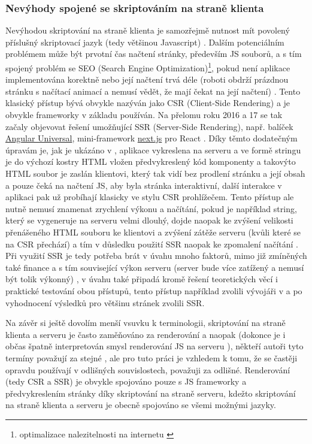         \subsubsection{Nevýhody spojené se skriptováním na straně klienta}
        Nevýhodou skriptování na straně klienta je samozřejmě nutnost mít povolený příslušný skriptovací jazyk (tedy většinou Javascript) \cite{scripting-sqa}. Dalším potenciálním problémem může být prvotní čas načtení stránky, především JS souborů, a s tím spojený problém se SEO (Search Engine Optimization)\footnote{optimalizace nalezitelnosti na internetu \cite{seo}}, pokud není aplikace implementována korektně nebo její načtení trvá déle (roboti obdrží prázdnou stránku s načítací animací a nemusí vědět, že mají čekat na její načtení) \cite{scripting-freecodecamp}\cite{scripting-hackernoon}. Tento klasický přístup bývá obvykle nazýván jako CSR (Client-Side Rendering) a je obvykle frameworky v základu používán. Na přelomu roku 2016 a 17 se tak začaly objevovat řešení umožňující SSR (Server-Side Rendering), např. balíček \href{https://github.com/angular/universal}{Angular Universal}, mini-framework \href{https://github.com/zeit/next.js/}{next.js} pro React \cite{scripting-hackernoon}. Díky těmto dodatečným úpravám je, jak je ukázáno v \cite{scripting-ytb}, aplikace vykreslena na serveru a ve formě stringu je do výchozí kostry HTML vložen předvykreslený kód komponenty a takovýto HTML soubor je zaslán klientovi, který tak vidí bez prodlení stránku a její obsah a pouze čeká na načtení JS, aby byla stránka interaktivní, další interakce v aplikaci pak už probíhají klasicky ve stylu CSR prohlížečem. Tento přístup ale nutně nemusí znamenat zrychlení výkonu a načítání, pokud je například string, který se vygeneruje na serveru velmi dlouhý, dojde naopak ke zvýšení velikosti přenášeného HTML souboru ke klientovi a zvýšení zátěže serveru (kvůli které se na CSR přechází) a tím v důsledku použití SSR naopak ke zpomalení načítání \cite{scripting-hackernoon}. Při využití SSR je tedy potřeba brát v úvahu mnoho faktorů, mimo již zmíněných také finance a s tím související výkon serveru (server bude více zatížený a nemusí být tolik výkonný) , v úvahu také připadá kromě řešení teoretických věcí i praktické testování obou přístupů, tento přístup například zvolili vývojáři v \cite{scripting-benchmark} a po vyhodnocení výsledků pro většinu stránek zvolili SSR.
        
        Na závěr si ještě dovolím menší vsuvku k terminologii, skriptování na straně klienta a serveru je často zaměňováno za renderování a naopak (dokonce je i občas špatně interpretován smysl renderování JS na serveru \cite{scripting-chyby}), někteří autoři tyto termíny považují za stejné \cite{scripting-freecodecamp}, ale pro tuto práci je vzhledem k tomu, že se častěji opravdu používají v odlišných souvislostech, považuji za odlišné. Renderování (tedy CSR a SSR) je obvykle spojováno pouze s JS frameworky a předvykreslením stránky díky skriptování na straně serveru, kdežto skriptování na straně klienta a serveru je obecně spojováno se všemi možnými jazyky.
    
